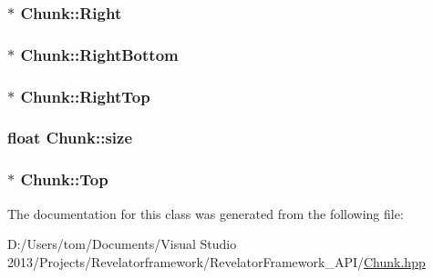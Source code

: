 \hypertarget{class_chunk_a0bcf134e2aba0ca49370272c2b3f17a4}{
\subsubsection[{Right}]{$\ast$ Chunk\-::\-Right\hspace{0.3cm}{\ttfamily [private]}}}\label{class_chunk_a0bcf134e2aba0ca49370272c2b3f17a4}
\hypertarget{class_chunk_afded01a9a67540c9f64dde5776021f4b}{
\subsubsection[{Right\-Bottom}]{$\ast$ Chunk\-::\-Right\-Bottom\hspace{0.3cm}{\ttfamily [private]}}}\label{class_chunk_afded01a9a67540c9f64dde5776021f4b}
\hypertarget{class_chunk_a8a7593c89d4fe5ed193e68b9ed40016b}{
\subsubsection[{Right\-Top}]{$\ast$ Chunk\-::\-Right\-Top\hspace{0.3cm}{\ttfamily [private]}}}\label{class_chunk_a8a7593c89d4fe5ed193e68b9ed40016b}
\hypertarget{class_chunk_af46410b580baf2985b01044d5c041b2e}{
\subsubsection[{size}]{\setlength{\rightskip}{0pt plus 5cm}float Chunk\-::size\hspace{0.3cm}{\ttfamily [private]}}}\label{class_chunk_af46410b580baf2985b01044d5c041b2e}
\hypertarget{class_chunk_ae841d5ab24dfa5ef8865cb4fa05d089d}{
\subsubsection[{Top}]{$\ast$ Chunk\-::\-Top\hspace{0.3cm}{\ttfamily [private]}}}\label{class_chunk_ae841d5ab24dfa5ef8865cb4fa05d089d}


The documentation for this class was generated from the following file\-:\begin{DoxyCompactItemize}
\item 
D\-:/\-Users/tom/\-Documents/\-Visual Studio 2013/\-Projects/\-Revelatorframework/\-Revelator\-Framework\-\_\-\-A\-P\-I/\hyperlink{_chunk_8hpp}{Chunk.\-hpp}\end{DoxyCompactItemize}
